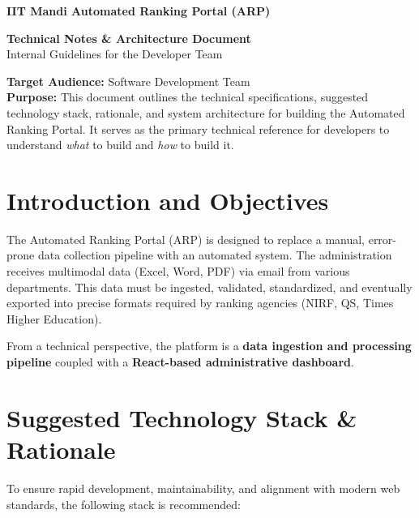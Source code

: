 \documentclass[11pt,a4paper]{article}
\begin{document}
\thispagestyle{empty}

\begin{center}
\textbf{\LARGE IIT Mandi Automated Ranking Portal (ARP)}

\vspace{0.5cm}

\textbf{\Huge Technical Notes \& Architecture Document} \\
\vspace{0.5cm}
\Large Internal Guidelines for the Developer Team
\end{center}

\vspace{1.5cm}

\noindent\textbf{Target Audience:} Software Development Team \\
\textbf{Purpose:} This document outlines the technical specifications, suggested technology stack, rationale, and system architecture for building the Automated Ranking Portal. It serves as the primary technical reference for developers to understand \textit{what} to build and \textit{how} to build it.

\vspace{1cm}

\newpage
\tableofcontents
\newpage

\section{Introduction and Objectives}
The Automated Ranking Portal (ARP) is designed to replace a manual, error-prone data collection pipeline with an automated system. The administration receives multimodal data (Excel, Word, PDF) via email from various departments. This data must be ingested, validated, standardized, and eventually exported into precise formats required by ranking agencies (NIRF, QS, Times Higher Education).

From a technical perspective, the platform is a \textbf{data ingestion and processing pipeline} coupled with a \textbf{React-based administrative dashboard}.

\section{Suggested Technology Stack \& Rationale}
To ensure rapid development, maintainability, and alignment with modern web standards, the following stack is recommended:
\end{document}
